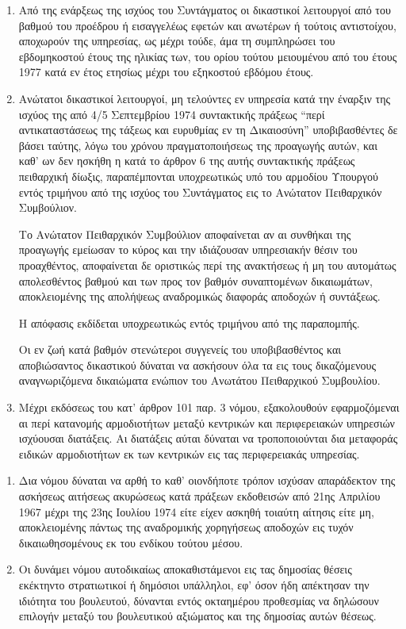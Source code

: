 \documentclass[twoside, a4paper, 10pt]{article}
\begin{document}
\begin{multicols}{2}
\begin{enumerate}
\begin{BigQuote}
\begin{enumerate}
  \item[1.] Από της ενάρξεως της ισχύος του Συντάγματος οι δικαστικοί λειτουργοί από του βαθμού του προέδρου ή εισαγγελέως εφετών και ανωτέρων ή τούτοις αντιστοίχου, αποχωρούν της υπηρεσίας, ως μέχρι τούδε, άμα τη συμπληρώσει του εβδομηκοστού έτους της ηλικίας των, του ορίου τούτου μειουμένου από του έτους 1977 κατά εν έτος ετησίως μέχρι του εξηκοστού εβδόμου έτους.
  \item[2.] Ανώτατοι δικαστικοί λειτουργοί, μη τελούντες εν υπηρεσία κατά την έναρξιν της ισχύος της από 4/5 Σεπτεμβρίου 1974 συντακτικής πράξεως “περί αντικαταστάσεως της τάξεως και ευρυθμίας εν τη Δικαιοσύνη” υποβιβασθέντες δε βάσει ταύτης, λόγω του χρόνου πραγματοποιήσεως της προαγωγής αυτών, και καθ' ων δεν ησκήθη η κατά το άρθρον 6 της αυτής συντακτικής  πράξεως πειθαρχική δίωξις, παραπέμπονται υποχρεωτικώς υπό του αρμοδίου Υπουργού εντός τριμήνου από της ισχύος του Συντάγματος εις το Ανώτατον Πειθαρχικόν Συμβούλιον.

	Το Ανώτατον Πειθαρχικόν Συμβούλιον αποφαίνεται αν αι συνθήκαι της προαγωγής  εμείωσαν το κύρος και την ιδιάζουσαν υπηρεσιακήν θέσιν του προαχθέντος, αποφαίνεται δε οριστικώς περί της ανακτήσεως ή μη του αυτομάτως απολεσθέντος βαθμού και των προς τον βαθμόν συναπτομένων δικαιωμάτων, αποκλειομένης της απολήψεως αναδρομικώς διαφοράς αποδοχών ή συντάξεως.

	Η απόφασις εκδίδεται υποχρεωτικώς εντός τριμήνου από της παραπομπής.

	Οι εν ζωή κατά βαθμόν στενώτεροι συγγενείς του υποβιβασθέντος και αποβιώσαντος δικαστικού δύναται να ασκήσουν όλα τα εις τους δικαζόμενους αναγνωριζόμενα δικαιώματα ενώπιον του Ανωτάτου Πειθαρχικού Συμβουλίου.
  \item[3.] Μέχρι εκδόσεως του κατ' άρθρον 101 παρ. 3 νόμου, εξακολουθούν εφαρμοζόμεναι αι περί κατανομής αρμοδιοτήτων μεταξύ κεντρικών και περιφερειακών υπηρεσιών ισχύουσαι διατάξεις. Αι διατάξεις αύται δύναται να τροποποιούνται δια μεταφοράς ειδικών αρμοδιοτήτων εκ των κεντρικών εις τας περιφερειακάς υπηρεσίας.
\end{enumerate}

\begin{enumerate}
  \item[1.] Δια νόμου δύναται να αρθή το καθ' οιονδήποτε τρόπον ισχύσαν απαράδεκτον της ασκήσεως αιτήσεως ακυρώσεως κατά πράξεων εκδοθεισών από 21ης Απριλίου 1967 μέχρι της 23ης Ιουλίου 1974 είτε είχεν ασκηθή τοιαύτη αίτησις είτε μη, αποκλειομένης πάντως της αναδρομικής χορηγήσεως αποδοχών εις τυχόν δικαιωθησομένους εκ του ενδίκου τούτου μέσου.
  \item[2.] Οι δυνάμει νόμου αυτοδικαίως  αποκαθιστάμενοι εις τας δημοσίας θέσεις εκέκτηντο στρατιωτικοί ή δημόσιοι υπάλληλοι, εφ' όσον ήδη απέκτησαν την ιδιότητα του βουλευτού, δύνανται εντός οκταημέρου προθεσμίας να δηλώσουν επιλογήν μεταξύ του βουλευτικού αξιώματος και της δημοσίας αυτών θέσεως. 
\end{enumerate}


\end{BigQuote}
\end{enumerate}
\end{multicols}
\end{document}
